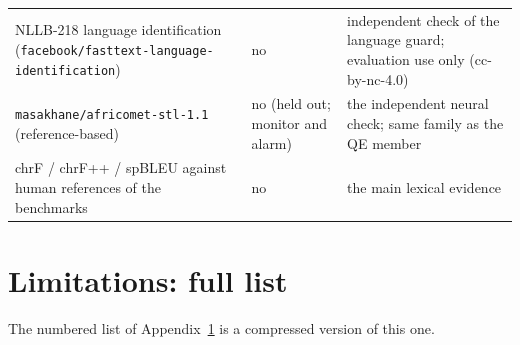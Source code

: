 \begin{table}[t]
\begin{tabularx}{\linewidth}{@{}>{\raggedright\arraybackslash}X>{\raggedright\arraybackslash}X>{\raggedright\arraybackslash}X@{}}
NLLB-218 language identification (\texttt{facebook/\allowbreak{}fasttext-\allowbreak{}language-\allowbreak{}identification}) & no & independent check of the language guard; evaluation use only (cc-by-nc-4.0) \\
\texttt{masakhane/\allowbreak{}africomet-\allowbreak{}stl-\allowbreak{}1.\allowbreak{}1} (reference-based) & no (held out; monitor and alarm) & the independent neural check; same family as the QE member \\
chrF / chrF++ / spBLEU against human references of the benchmarks & no & the main lexical evidence \\
\bottomrule
\end{tabularx}
\end{table}


\section{Limitations: full list}\label{app:limits}

The numbered list of Appendix~\ref{app:limits} is a compressed version of this one.

